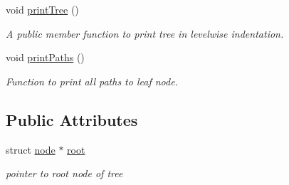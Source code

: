 \begin{DoxyCompactItemize}
\mbox{\label{classBST_aa01a4e3c8c730f3597ebe014a8c5f3b7}} 
void \hyperlink{classBST_aa01a4e3c8c730f3597ebe014a8c5f3b7}{print\+Tree} ()
\begin{DoxyCompactList}\small\item\em A public member function to print tree in levelwise indentation. \end{DoxyCompactList}\item 
\mbox{\label{classBST_a81d0521bfe518d9556af83199abb1f35}} 
void \hyperlink{classBST_a81d0521bfe518d9556af83199abb1f35}{print\+Paths} ()
\begin{DoxyCompactList}\small\item\em Function to print all paths to leaf node. \end{DoxyCompactList}\end{DoxyCompactItemize}
\subsection*{Public Attributes}
\begin{DoxyCompactItemize}
\item 
\mbox{\label{classBST_a649f05efb8f63efa407101a485319f2d}} 
struct \hyperlink{structnode}{node} $\ast$ \hyperlink{classBST_a649f05efb8f63efa407101a485319f2d}{root}
\begin{DoxyCompactList}\small\item\em pointer to root node of tree \end{DoxyCompactList}\end{DoxyCompactItemize}
